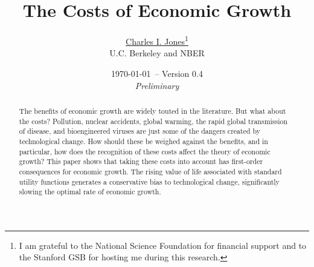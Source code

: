\documentclass[12pt,twoside]{article}
\begin{document}



\begin{spacing}{0.9}
\begin{titlepage}


\title{The Costs of Economic Growth}


\author{\large \href{http://elsa.berkeley.edu/~chad}{Charles I.
    Jones}\thanks{I am grateful to the National Science Foundation for
    financial support and to the Stanford GSB for hosting me during this
    research.}\\ { U.C. Berkeley and NBER}
}

\date{\small \today \ -- Version 0.4\\ {\it Preliminary}}
\maketitle
\thispagestyle{empty}

\vspace{-0.3in}

\begin{abstract}

The benefits of economic growth are widely touted in the literature. But
what about the costs? Pollution, nuclear accidents, global warming, the
rapid global transmission of disease, and bioengineered viruses are just
some of the dangers created by technological change. How should these be
weighed against the benefits, and in particular, how does the
recognition of these costs affect the theory of economic growth? This
paper shows that taking these costs into account has first-order
consequences for economic growth. The rising value of life associated
with standard utility functions generates a conservative bias to
technological change, significantly slowing the optimal rate of economic
growth.

\end{abstract}

\end{titlepage}
\end{spacing}
\end{document}
